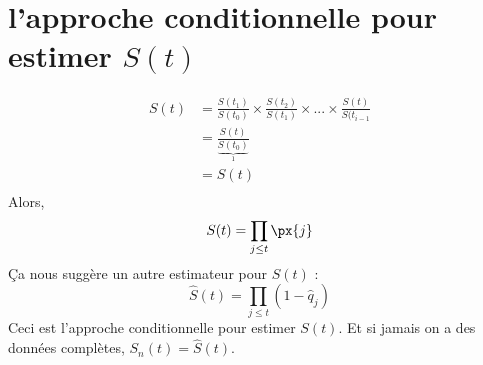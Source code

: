 \documentclass[12pt, french]{report}
\begin{document}
\section{l'approche conditionnelle pour estimer $S(t)$}

\begin{align*}
S(t)		& = \frac{S(t_1)}{S(t_0)} \times \frac{S(t_2)}{S(t_1)} \times ... \times \frac{S(t)}{S(t_{i-1}} \\
	& = \frac{S(t)}{\underbrace{S(t_0)}_{1}} \\
	& = S(t) \\
\end{align*}
Alors,
\begin{equation}
S(t) = \prod_{j \leq t} \px{j}
\end{equation}
Ça nous suggère un autre estimateur pour $S(t)$ : 
\begin{equation}
\hat{S}(t) = \prod_{j \leq t} (1 - \hat{q}_j )
\end{equation}
Ceci est l'approche conditionnelle pour estimer $S(t)$. Et si jamais on a des données complètes, $S_n(t) = \hat{S}(t)$.
\end{document}
